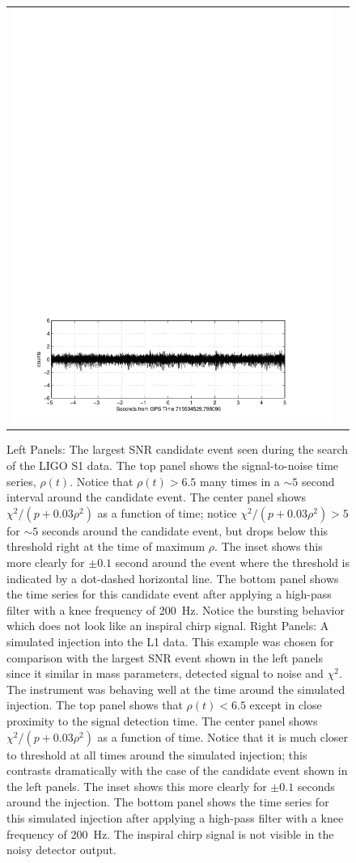 \begin{figure}[thb]
\begin{center}
\begin{tabular}{cc}
\includegraphics[width=0.45\linewidth]{figures/pipeline/injection-ts}
\end{tabular}
\end{center}
\caption{\label{f:snrplot}
Left Panels: The largest SNR candidate event seen during the search of the
LIGO S1 data. The top panel shows the signal-to-noise time series,
$\rho(t)$.  Notice that $\rho(t) > 6.5$ many times in a  $\sim 5$ second
interval around the candidate event.   The center panel shows $\chi^2/ (p+
0.03 \rho^2)$ as a function of time;  notice $\chi^2 / (p+ 0.03 \rho^2) > 5$
for $\sim 5$ seconds around the candidate event,  but drops below this
threshold right at the time of maximum $\rho$.  The inset shows this more
clearly for $\pm 0.1$ second around the event where the threshold is indicated
by a dot-dashed horizontal line.  The bottom panel shows the time series for
this candidate event after applying a high-pass filter with a knee frequency
of 200~Hz.  Notice the bursting behavior which does not look like an inspiral
chirp signal.  \break
Right Panels: A simulated injection into the L1 data.  This example was chosen
for comparison with the largest SNR event shown in the left panels since it
similar in mass parameters, detected signal to noise and $\chi^2$.   The
instrument was behaving well at the time around the simulated injection.  The
top panel shows that $\rho(t) < 6.5$ except in close proximity to the signal
detection time.   The center panel shows $\chi^2/ (p+ 0.03 \rho^2)$ as a
function of time.  Notice that it is much closer to threshold at all times
around the simulated injection; this contrasts dramatically with the case of
the candidate event shown in the left panels.   The inset shows this more
clearly for $\pm 0.1$ seconds around the injection.  The bottom panel shows
the time series for this simulated injection after applying a high-pass filter
with a knee frequency of 200~Hz.  The inspiral chirp signal is not visible in
the noisy detector output.}
\end{figure}

